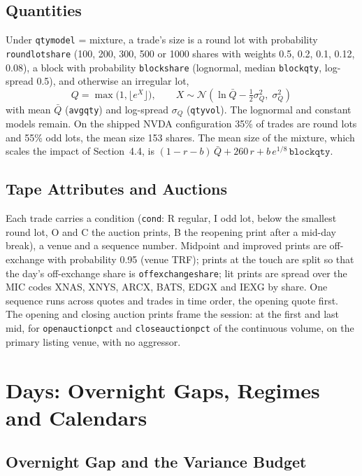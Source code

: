 \documentclass[11pt,a4paper]{article}
\newcommand{\key}[1]{\texttt{#1}}
\theoremstyle{paper}
\begin{document}
\subsection{Quantities}

Under \key{qtymodel} = mixture, a trade's size is a round lot with probability \key{roundlotshare} (100, 200, 300, 500 or 1000 shares with weights 0.5, 0.2, 0.1, 0.12, 0.08), a block with probability \key{blockshare} (lognormal, median \key{blockqty}, log-spread 0.5), and otherwise an irregular lot,
\begin{equation}
Q=\max\bigl(1,\lfloor e^{X}\rfloor\bigr),\qquad X\sim\mathcal N\!\left(\ln\bar Q-\tfrac12\sigma_Q^2,\;\sigma_Q^2\right)
\end{equation}
with mean $\bar Q$ (\key{avgqty}) and log-spread $\sigma_Q$ (\key{qtyvol}). The lognormal and constant models remain. On the shipped NVDA configuration 35\% of trades are round lots and 55\% odd lots, the mean size 153 shares. The mean size of the mixture, which scales the impact of Section~4.4, is $(1-r-b)\,\bar Q+260\,r+b\,e^{1/8}\,\key{blockqty}$.

\subsection{Tape Attributes and Auctions}

Each trade carries a condition (\key{cond}: R regular, I odd lot, below the smallest round lot, O and C the auction prints, B the reopening print after a mid-day break), a venue and a sequence number. Midpoint and improved prints are off-exchange with probability 0.95 (venue TRF); prints at the touch are split so that the day's off-exchange share is \key{offexchangeshare}; lit prints are spread over the MIC codes XNAS, XNYS, ARCX, BATS, EDGX and IEXG by share. One sequence runs across quotes and trades in time order, the opening quote first. The opening and closing auction prints frame the session: at the first and last mid, for \key{openauctionpct} and \key{closeauctionpct} of the continuous volume, on the primary listing venue, with no aggressor.

\section{Days: Overnight Gaps, Regimes and Calendars}\label{sec:days}

\subsection{Overnight Gap and the Variance Budget}
\end{document}
